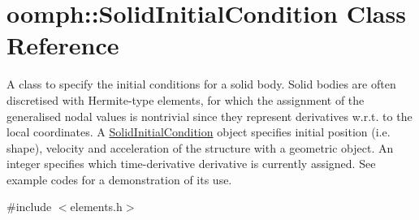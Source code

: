 \hypertarget{classoomph_1_1SolidInitialCondition}{}\section{oomph\+:\+:Solid\+Initial\+Condition Class Reference}
\label{classoomph_1_1SolidInitialCondition}


A class to specify the initial conditions for a solid body. Solid bodies are often discretised with Hermite-\/type elements, for which the assignment of the generalised nodal values is nontrivial since they represent derivatives w.\+r.\+t. to the local coordinates. A \hyperlink{classoomph_1_1SolidInitialCondition}{Solid\+Initial\+Condition} object specifies initial position (i.\+e. shape), velocity and acceleration of the structure with a geometric object. An integer specifies which time-\/derivative derivative is currently assigned. See example codes for a demonstration of its use.  




{\ttfamily \#include $<$elements.\+h$>$}

